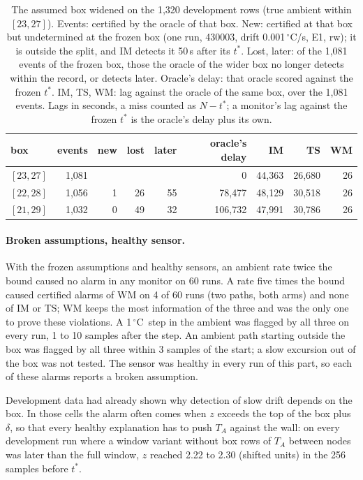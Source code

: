 \documentclass[11pt,a4paper]{article}
\newcommand{\degC}{\ensuremath{{}^\circ}C}
\newcommand{\tstar}{t^{\ast}}
\begin{document}
\begin{table}[ht]
\centering\small
\caption{The assumed box widened on the 1,320 development rows (true ambient within $[23, 27]$). Events: certified by
the oracle of that box. New: certified at that box but undetermined at the frozen box (one run, 430003, drift
0.001\,\degC/s, E1, rw); it is outside the split, and IM detects it 50\,s after its $\tstar$. Lost, later: of the 1,081
events of the frozen box, those the oracle of the wider box no longer detects within the record, or detects later. Oracle's delay: that oracle scored against the frozen $\tstar$. IM, TS,
WM: lag against the oracle of the same box, over the 1,081 events. Lags in seconds, a miss counted as $N-\tstar$; a
monitor's lag against the frozen $\tstar$ is the oracle's delay plus its own.}
\label{tab:widebox}
\begin{tabular}{lrrrrrrrr}
\toprule
box & events & new & lost & later & oracle's delay & IM & TS & WM\\
\midrule
$[23, 27]$ & 1,081 & & & & 0 & 44,363 & 26,680 & 26\\
$[22, 28]$ & 1,056 & 1 & 26 & 55 & 78,477 & 48,129 & 30,518 & 26\\
$[21, 29]$ & 1,032 & 0 & 49 & 32 & 106,732 & 47,991 & 30,786 & 26\\
\bottomrule
\end{tabular}
\end{table}

\paragraph{Broken assumptions, healthy sensor.} With the frozen assumptions and healthy sensors, an ambient rate twice
the bound caused no alarm in any monitor on 60 runs. A rate five times the bound caused certified alarms of WM on 4 of
60 runs (two paths, both arms) and none of IM or TS; WM keeps the most information of the three and was the only one to
prove these violations. A 1\,\degC\ step in the ambient was flagged by all three on every run, 1 to 10 samples after the
step. An ambient path starting outside the box was flagged by all three within 3 samples of the start; a slow excursion
out of the box was not tested. The sensor was healthy in every run of this part, so each of these alarms reports a
broken assumption.

Development data had already shown why detection of slow drift depends on the box. In those cells the alarm often
comes when $z$ exceeds the top of the box plus $\delta$, so that every healthy explanation has to push $T_A$ against
the wall: on every development run where a window variant without box rows of $T_A$ between nodes was later than the
full window, $z$ reached 2.22 to 2.30 (shifted units) in the 256 samples before $\tstar$.
\end{document}
